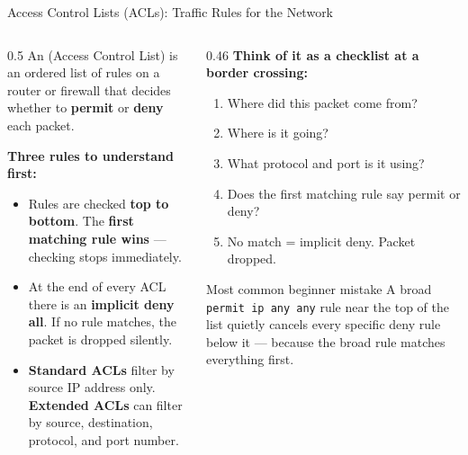 \documentclass[aspectratio=169]{beamer}  %
\begin{document}
\begin{frame}{Access Control Lists (ACLs): Traffic Rules for the Network}
    \begin{columns}[T]
        \begin{column}{0.5\textwidth}
            \footnotesize
            An  (Access Control List) is an ordered list of rules on a router or firewall that decides whether to \textbf{permit} or \textbf{deny} each packet.

            \vspace{0.4em}
            \textbf{Three rules to understand first:}
            \begin{itemize}
                \item Rules are checked \textbf{top to bottom}. The \textbf{first matching rule wins} --- checking stops immediately.
                \item At the end of every ACL there is an \textbf{implicit deny all}. If no rule matches, the packet is dropped silently.
                \item \textbf{Standard ACLs} filter by source IP address only. \textbf{Extended ACLs} can filter by source, destination, protocol, and port number.
            \end{itemize}
        \end{column}
        \begin{column}{0.46\textwidth}
            \footnotesize
            \textbf{Think of it as a checklist at a border crossing:}
            \begin{enumerate}
                \item Where did this packet come from?
                \item Where is it going?
                \item What protocol and port is it using?
                \item Does the first matching rule say permit or deny?
                \item No match = implicit deny. Packet dropped.
            \end{enumerate}

            \begin{alertblock}{Most common beginner mistake}
                \footnotesize
                A broad \texttt{permit ip any any} rule near the top of the list quietly cancels every specific deny rule below it --- because the broad rule matches everything first.
            \end{alertblock}
        \end{column}
    \end{columns}
\end{frame}
\end{document}
